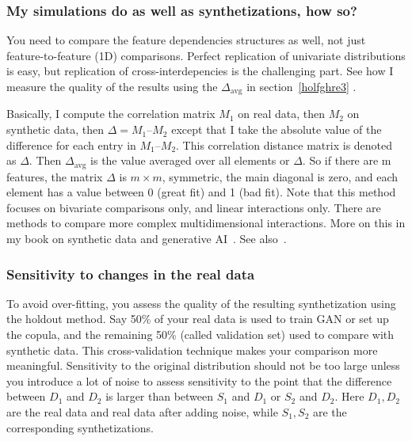 \documentclass[oneside,10pt]{book}
\begin{document}
\subsubsection{My simulations do as well as synthetizations, how so?}

You need to compare the feature dependencies structures as well, not just feature-to-feature (1D) comparisons. Perfect replication of univariate distributions is easy, but replication of cross-interdepencies is the challenging part. See how I measure the quality of the results using the 
$\Delta_{\text{avg}}$ in section~\ref{holfghre3} .

Basically, I compute the correlation matrix $M_1$ on real data, then $M_2$ on synthetic data, then $\Delta = M_1 – M_2$ except that I take the absolute value of the difference for each entry in $M_1 – M_2$. This 
\textcolor{index}{correlation distance matrix} is denoted as $\Delta$. Then $\Delta_{\text{avg}}$ is the value averaged over all elements or $\Delta$. 
So if there are m features, the matrix $\Delta$ is $m \times m$, symmetric, the main diagonal is zero, and each element has a value between 0 (great fit) and 1 (bad fit). Note that this method focuses on bivariate comparisons only, and linear interactions only. There are methods to compare more complex multidimensional interactions. 
More on this in my book on synthetic data and generative AI~\cite{vgelsevier}. See also~\cite{ieeeaccess22}.


\subsubsection{Sensitivity to changes in the real data}

To avoid over-fitting, you assess the quality of the resulting synthetization using the \textcolor{index}{holdout method}. Say 50\% of your real data is used to train GAN or set up the copula, and the remaining 50\% (called validation set) used to compare with synthetic data. This cross-validation technique makes your comparison more meaningful. Sensitivity to the original distribution should not be too large unless you introduce a lot of noise to assess sensitivity to the point that the difference between $D_1$ and $D_2$ is larger than between $S_1$ and $D_1$ or $S_2$ and $D_2$. Here $D_1, D_2$ are the real data and real data after adding noise, while $S_1, S_2$ are the corresponding synthetizations.
\end{document}
